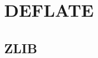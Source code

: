 \begin{comment}
  
\end{comment}

\chapter{DEFLATE}
\label{cha:deflate}


  \cite{cormen2009introduction_to_algo}


  \cite{pkware:_appnot}

  \cite{deutsch96:_deflat_compr_data_format_specif}

  \cite{Salomon:2004:DCC}

  \cite{katz91:_deflate_patent}

  \cite{feldspar:_explan_deflat_algor}

\section{ZLIB}



\cite{gailly96:_zlib_compr_data_format_specif}

